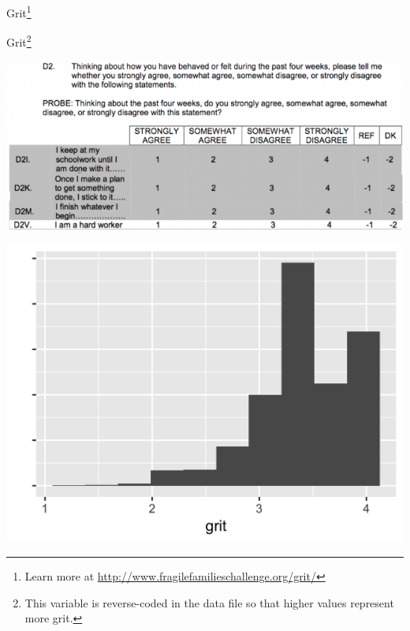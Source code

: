 \documentclass[aspectratio=169]{beamer}
\begin{document}
\begin{frame}

\Large{
\begin{center}
Grit\footnote{Learn more at \url{http://www.fragilefamilieschallenge.org/grit/}} 
\end{center}
}

\end{frame}
\begin{frame}{Grit\footnote{This variable is reverse-coded in the data file so that higher values represent more grit.}}

\centering
\includegraphics[width = .9\textwidth]{figures/grit_questionnaire2}

\end{frame}
\begin{frame}

\centering
\includegraphics[width = .8\textwidth]{figures/gritDist}

\end{frame}
\end{document}
